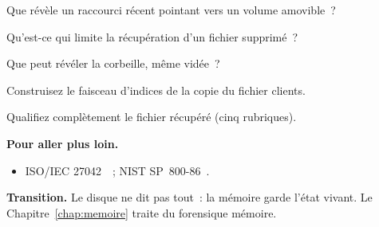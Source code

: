 \begin{boxexo}[title={\ding{45}\quad Exercice~11.6. Raccourci \niveaumoyen}]
Que révèle un raccourci récent pointant vers un volume amovible~?
\end{boxexo}

\begin{boxexo}[title={\ding{45}\quad Exercice~11.7. Écrasement \niveaumoyen}]
Qu'est-ce qui limite la récupération d'un fichier supprimé~?
\end{boxexo}

\begin{boxexo}[title={\ding{45}\quad Exercice~11.8. Corbeille \niveaumoyen}]
Que peut révéler la corbeille, même vidée~?
\end{boxexo}

\begin{boxexo}[title={\ding{45}\quad Exercice~11.9. Faisceau \niveauexpert}]
Construisez le faisceau d'indices de la copie du fichier clients.
\end{boxexo}

\begin{boxexo}[title={\ding{45}\quad Exercice~11.10. Qualification \niveauexpert}]
Qualifiez complètement le fichier récupéré (cinq rubriques).
\end{boxexo}

\bigskip

\begin{boxinfo}
\textbf{Pour aller plus loin.}
\begin{itemize}
    \item ISO/IEC 27042~\cite{iso27042}~; NIST SP~800-86~\cite{nist80086}.
\end{itemize}
\end{boxinfo}

\begin{boxinfo}
\textbf{Transition.} Le disque ne dit pas tout~: la mémoire garde l'état
vivant. Le Chapitre~\ref{chap:memoire} traite du forensique mémoire.
\end{boxinfo}
